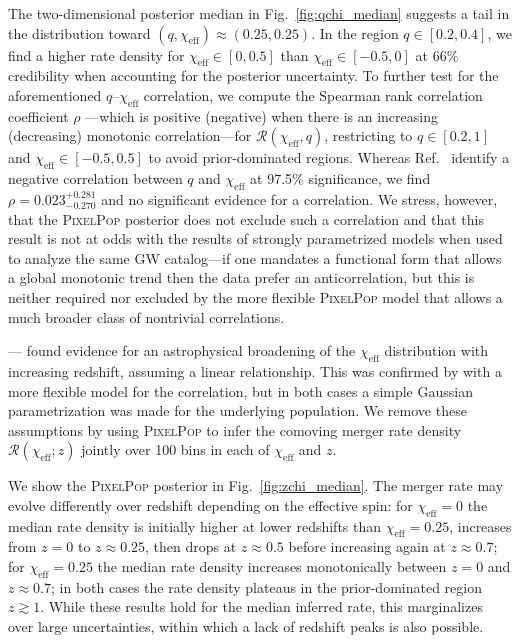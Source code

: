\begin{refsection}
The two-dimensional posterior median in Fig.~\ref{fig:qchi_median} suggests a tail in the distribution toward $(q, \chi_\mathrm{eff}) \approx (0.25, 0.25)$. In the region $q \in [0.2, 0.4]$, we find a higher rate density for $\chi_\mathrm{eff} \in [0, 0.5]$ than $\chi_\mathrm{eff} \in [-0.5,0]$ at 66\% credibility when accounting for the posterior uncertainty. To further test for the aforementioned $q$--$\chi_\mathrm{eff}$ correlation, we compute the Spearman rank correlation coefficient $\rho$ \cite{Spearman:1904abc,kendall1979advanced}---which is positive (negative) when there is an increasing (decreasing) monotonic correlation---for $\mathcal{R}(\chi_\mathrm{eff},q)$, restricting to $q \in [0.2, 1]$ and $\chi_\mathrm{eff} \in [-0.5,0.5]$ to avoid prior-dominated regions. Whereas Ref.~\cite{KAGRA:2021duu} identify a negative correlation between $q$ and $\chi_\mathrm{eff}$ at 97.5\% significance, we find $\rho = 0.023_{-0.270}^{+0.281}$ and no significant evidence for a correlation. We stress, however, that the \textsc{PixelPop} posterior does not exclude such a correlation and that this result is not at odds with the results of strongly parametrized models \cite{Callister:2021fpo, KAGRA:2021duu, Adamcewicz:2022hce, Heinzel:2023hlb} when used to analyze the same GW catalog---if one mandates a functional form that allows a global monotonic trend then the data prefer an anticorrelation, but this is neither required nor excluded by the more flexible \textsc{PixelPop} model that allows a much broader class of nontrivial correlations.

---\citeauthor{Biscoveanu:2022qac} \cite{Biscoveanu:2022qac} found evidence for an astrophysical broadening of the $\chi_\mathrm{eff}$ distribution with increasing redshift, assuming a linear relationship. This was confirmed by \citeauthor{Heinzel:2023hlb} \cite{Heinzel:2023hlb} with a more flexible model for the correlation, but in both cases a simple Gaussian parametrization was made for the underlying population. We remove these assumptions by using \textsc{PixelPop} to infer the comoving merger rate density $\mathcal{R}(\chi_\mathrm{eff};z)$ jointly over 100 bins in each of $\chi_\mathrm{eff}$ and $z$.

We show the \textsc{PixelPop} posterior in Fig.~\ref{fig:zchi_median}. The merger rate may evolve differently over redshift depending on the effective spin: for $\chi_\mathrm{eff}=0$ the median rate density is initially higher at lower redshifts than $\chi_\mathrm{eff}=0.25$, increases from $z=0$ to $z\approx0.25$, then drops at $z\approx0.5$ before increasing again at $z\approx0.7$; for $\chi_\mathrm{eff}=0.25$ the median rate density increases monotonically between $z=0$ and $z\approx0.7$; in both cases the rate density plateaus in the prior-dominated region $z\gtrsim1$. While these results hold for the median inferred rate, this marginalizes over large uncertainties, within which a lack of redshift peaks is also possible.


\end{refsection}

